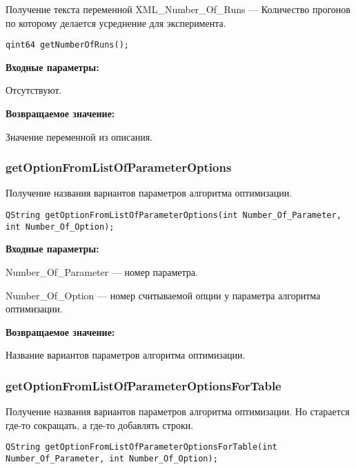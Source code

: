 \documentclass[a4paper,12pt]{article}
\begin{document}
Получение текста переменной  XML\_Number\_Of\_Runs --- Количество прогонов по которому делается усреднение для эксперимента.


\begin{lstlisting}[label=code_syntax_getNumberOfRuns,caption=Синтаксис]
qint64 getNumberOfRuns();
\end{lstlisting}

\textbf{Входные параметры:}

Отсутствуют.

\textbf{Возвращаемое значение:}

Значение переменной из описания.


\subsubsection{getOptionFromListOfParameterOptions}\label{getOptionFromListOfParameterOptions}

Получение названия вариантов параметров алгоритма оптимизации.


\begin{lstlisting}[label=code_syntax_getOptionFromListOfParameterOptions,caption=Синтаксис]
QString getOptionFromListOfParameterOptions(int Number_Of_Parameter, int Number_Of_Option);
\end{lstlisting}

\textbf{Входные параметры:}

Number\_Of\_Parameter --- номер параметра.
 
    Number\_Of\_Option --- номер считываемой опции у параметра алгоритма оптимизации.

\textbf{Возвращаемое значение:}

Название вариантов параметров алгоритма оптимизации.


\subsubsection{getOptionFromListOfParameterOptionsForTable}\label{getOptionFromListOfParameterOptionsForTable}

Получение названия вариантов параметров алгоритма оптимизации. Но старается где-то сокращать, а где-то добавлять строки.


\begin{lstlisting}[label=code_syntax_getOptionFromListOfParameterOptionsForTable,caption=Синтаксис]
QString getOptionFromListOfParameterOptionsForTable(int Number_Of_Parameter, int Number_Of_Option);
\end{lstlisting}
\end{document}
